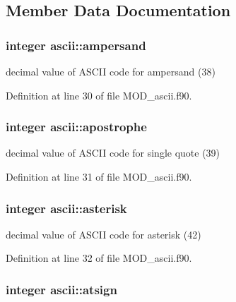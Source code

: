\subsection{Member Data Documentation}
\hypertarget{classascii_adc2c00ee0f6aa85ba337326a85360b81}{
\subsubsection[{ampersand}]{\setlength{\rightskip}{0pt plus 5cm}integer ascii\-::ampersand}}\label{classascii_adc2c00ee0f6aa85ba337326a85360b81}


decimal value of A\-S\-C\-I\-I code for ampersand (38) 



Definition at line 30 of file M\-O\-D\-\_\-ascii.\-f90.

\hypertarget{classascii_a544369830d6a173e0e041bc662570e5d}{
\subsubsection[{apostrophe}]{\setlength{\rightskip}{0pt plus 5cm}integer ascii\-::apostrophe}}\label{classascii_a544369830d6a173e0e041bc662570e5d}


decimal value of A\-S\-C\-I\-I code for single quote (39) 



Definition at line 31 of file M\-O\-D\-\_\-ascii.\-f90.

\hypertarget{classascii_acc920ceac14d38de4689188ad4db458d}{
\subsubsection[{asterisk}]{\setlength{\rightskip}{0pt plus 5cm}integer ascii\-::asterisk}}\label{classascii_acc920ceac14d38de4689188ad4db458d}


decimal value of A\-S\-C\-I\-I code for asterisk (42) 



Definition at line 32 of file M\-O\-D\-\_\-ascii.\-f90.

\hypertarget{classascii_a3d714a294231b6d9d86c8f74cd0fdf5f}{
\subsubsection[{atsign}]{\setlength{\rightskip}{0pt plus 5cm}integer ascii\-::atsign}}\label{classascii_a3d714a294231b6d9d86c8f74cd0fdf5f}



